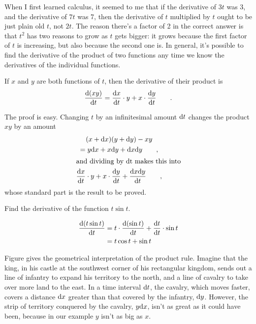 When I first learned calculus, it seemed to me that if the derivative of $3t$ was $3$, and the derivative of
$7t$ was 7, then the derivative of $t$ multiplied by $t$ ought to be just plain old $t$, not $2t$. The reason there's
a factor of 2 in the correct answer is that $t^2$ has two reasons to grow as $t$ gets bigger: it grows because
the first factor of $t$ is increasing, but also because the second one is. In general, it's possible to find
the derivative of the product of two functions any time we know the derivatives of the individual functions.

\begin{important}
If $x$ and $y$ are both functions of $t$, then the derivative of their product is
\begin{equation*}
  \frac{\textup{d}(xy)}{\textup{d} t} = \frac{\textup{d} x}{\textup{d} t}\cdot y +  x \cdot \frac{\textup{d} y}{\textup{d} t} \qquad .
\end{equation*}
\end{important}

The proof is easy. Changing $t$ by an infinitesimal amount $\textup{d} t$ changes the product $xy$ by
an amount
\begin{gather*}
  (x+\textup{d} x)(y+\textup{d} y)-xy \\
      = y\textup{d} x + x\textup{d} y+\textup{d} x\textup{d} y \qquad , \\
\intertext{and dividing by \textup{d}t makes this into}
      \frac{\textup{d} x}{\textup{d} t}\cdot y +  x \cdot \frac{\textup{d} y}{\textup{d} t} + \frac{\textup{d} x \textup{d} y}{\textup{d} t} \qquad ,
\end{gather*}
whose standard part is the result to be proved.

\begin{eg}
\egquestion Find the derivative of the function $t\sin t$.

\eganswer
\begin{align*}
  \frac{\textup{d}(t\sin t)}{\textup{d} t} &= t\cdot \frac{\textup{d}(\sin t)}{\textup{d} t}+\frac{\textup{d} t}{\textup{d} t}\cdot\sin t \\
           &= t\cos t+\sin t
\end{align*}
\end{eg}

Figure  gives the geometrical interpretation of the product rule. Imagine that the king, in his castle
at the southwest corner of his rectangular kingdom, sends out a line of infantry to expand his territory
to the north, and a line of cavalry to take over more land to the east. In a time interval $\textup{d} t$,
the cavalry, which moves faster, covers a distance $\textup{d} x$ greater than that covered by the infantry,
$\textup{d} y$. However, the strip of territory conquered by the cavalry, $y \textup{d} x$, isn't as great as it could have been,
because in our example $y$ isn't as big as $x$.
%

